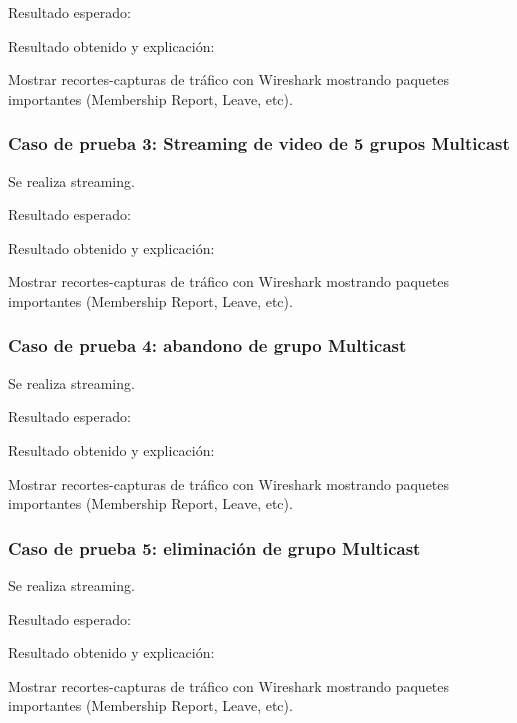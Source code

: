 \documentclass[12pt,a4paper,oneside]{book}
\begin{document}
\vspace{0.5cm}
Resultado esperado: 

\vspace{0.5cm}
Resultado obtenido y explicación: 

\vspace{0.5cm}
Mostrar recortes-capturas de tráfico con Wireshark mostrando paquetes importantes (Membership Report, Leave, etc).

\subsubsection{Caso de prueba 3: Streaming de video de 5 grupos Multicast} 

Se realiza streaming.

\vspace{0.5cm}
Resultado esperado: 

\vspace{0.5cm}
Resultado obtenido y explicación: 

\vspace{0.5cm}
Mostrar recortes-capturas de tráfico con Wireshark mostrando paquetes importantes (Membership Report, Leave, etc).

\subsubsection{Caso de prueba 4: abandono de grupo Multicast} 

Se realiza streaming.

\vspace{0.5cm}
Resultado esperado: 

\vspace{0.5cm}
Resultado obtenido y explicación: 

\vspace{0.5cm}
Mostrar recortes-capturas de tráfico con Wireshark mostrando paquetes importantes (Membership Report, Leave, etc).

\subsubsection{Caso de prueba 5: eliminación de grupo Multicast} 
Se realiza streaming.

\vspace{0.5cm}
Resultado esperado: 

\vspace{0.5cm}
Resultado obtenido y explicación: 

\vspace{0.5cm}
Mostrar recortes-capturas de tráfico con Wireshark mostrando paquetes importantes (Membership Report, Leave, etc).
\end{document}

